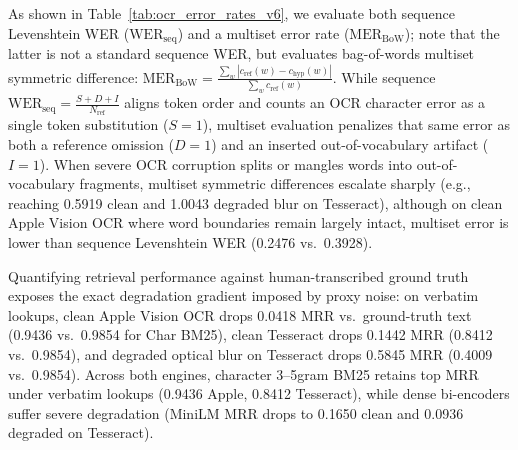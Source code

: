 \documentclass[conference]{IEEEtran}
\begin{document}
As shown in Table~\ref{tab:ocr_error_rates_v6}, we evaluate both sequence Levenshtein WER ($\text{WER}_{\text{seq}}$) and a multiset error rate ($\text{MER}_{\text{BoW}}$); note that the latter is not a standard sequence WER, but evaluates bag-of-words multiset symmetric difference: $\text{MER}_{\text{BoW}} = \frac{\sum_w |c_{\text{ref}}(w) - c_{\text{hyp}}(w)|}{\sum_w c_{\text{ref}}(w)}$. While sequence $\text{WER}_{\text{seq}} = \frac{S + D + I}{N_{\text{ref}}}$ aligns token order and counts an OCR character error as a single token substitution ($S=1$), multiset evaluation penalizes that same error as both a reference omission ($D=1$) and an inserted out-of-vocabulary artifact ($I=1$). When severe OCR corruption splits or mangles words into out-of-vocabulary fragments, multiset symmetric differences escalate sharply (e.g., reaching 0.5919 clean and 1.0043 degraded blur on Tesseract), although on clean Apple Vision OCR where word boundaries remain largely intact, multiset error is lower than sequence Levenshtein WER (0.2476 vs.\ 0.3928).

Quantifying retrieval performance against human-transcribed ground truth exposes the exact degradation gradient imposed by proxy noise: on verbatim lookups, clean Apple Vision OCR drops 0.0418 MRR vs.\ ground-truth text (0.9436 vs.\ 0.9854 for Char BM25), clean Tesseract drops 0.1442 MRR (0.8412 vs.\ 0.9854), and degraded optical blur on Tesseract drops 0.5845 MRR (0.4009 vs.\ 0.9854). Across both engines, character 3--5gram BM25 retains top MRR under verbatim lookups (0.9436 Apple, 0.8412 Tesseract), while dense bi-encoders suffer severe degradation (MiniLM MRR drops to 0.1650 clean and 0.0936 degraded on Tesseract).

\begin{table}[t]
\centering\small
\caption{Standardized JiWER OCR Error Rates on SROIE Receipts ($N=626$). Multiset Error Rate evaluates bag-of-words symmetric difference (non-standard sequence WER).}\label{tab:ocr_error_rates_v6}
\end{table}
\end{document}
